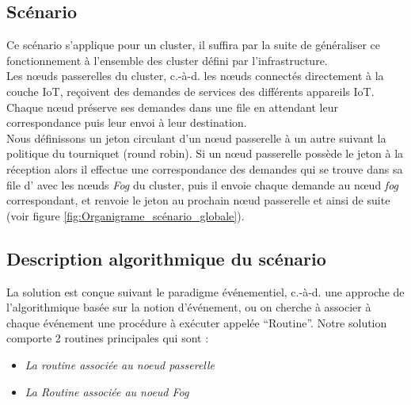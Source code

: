\subsection{Scénario}
Ce scénario s’applique pour un cluster, il suffira par la suite de généraliser ce fonctionnement à l'ensemble des cluster défini par l’infrastructure.\\
Les nœuds passerelles du cluster, c.-à-d. les nœuds connectés directement à la couche IoT, reçoivent des demandes de services des différents appareils IoT. Chaque nœud préserve ses demandes dans une file en attendant leur correspondance puis leur envoi à leur destination.\\
Nous définissons un jeton circulant d’un nœud passerelle à un autre suivant la politique du tourniquet (round robin). Si un nœud passerelle possède le jeton à la réception alors il effectue une correspondance des demandes qui se trouve dans sa file d' avec les nœuds \emph{Fog} du cluster, puis il envoie chaque demande au nœud \emph{fog} correspondant, et  renvoie le jeton au prochain nœud passerelle et ainsi de suite (voir figure \ref{fig:Organigrame_scénario_globale}).
\subsection{Description algorithmique du scénario}
La solution est conçue suivant le paradigme événementiel, c.-à-d. une approche de l’algorithmique basée sur la notion d'événement, ou on cherche à associer à chaque événement une procédure à exécuter appelée “Routine”.   
Notre solution comporte 2 routines principales qui sont :
\begin{itemize}
    \item \emph{La routine associée au noeud passerelle}
    \item \emph{La Routine associée au noeud Fog}
\end{itemize}
